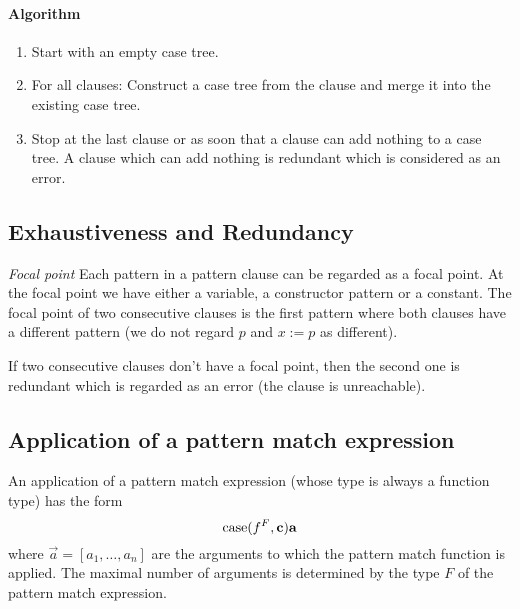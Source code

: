 \paragraph{Algorithm}

\begin{enumerate}
    \item Start with an empty case tree.

    \item For all clauses: Construct a case tree from the clause and merge it
        into the existing case tree.

    \item Stop at the last clause or as soon that a clause can add nothing to a
        case tree. A clause which can add nothing is redundant which is
        considered as an error.
\end{enumerate}







\subsection{Exhaustiveness and Redundancy}

\emph{Focal point}
Each pattern in a pattern clause can be regarded as a focal
point. At the focal point we have either a variable, a constructor pattern or a
constant. The focal point of two consecutive clauses is the first pattern where
both clauses have a different pattern (we do not regard $p$ and $x:=p$ as
different).

If two consecutive clauses don't have a focal point, then the second one is
redundant which is regarded as an error (the clause is unreachable).








\subsection{Application of a pattern match expression}

An application of a pattern match expression (whose type is always a function
type) has the form
$$
{\text{case}}(f^F, {\mathbf c}) {\mathbf a}
$$
where $\vec a = [a_1, \ldots, a_n]$ are the arguments to which the pattern match
function is applied. The maximal number of arguments is determined by the type
$F$ of the pattern match expression.

